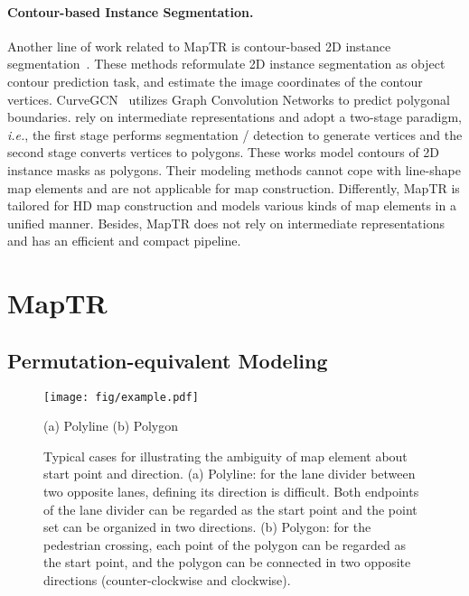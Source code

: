 \documentclass{article} \usepackage{iclr2023_conference,times}
\def\ie{\emph{i.e.}} \def\Ie{\emph{I.e.}}
\begin{document}
\paragraph{Contour-based Instance Segmentation.}
Another line of work related to MapTR is contour-based 2D instance segmentation~\citep{Zhu_2022_CVPR, polarmask, xu2019explicit,liu2021dance}. These methods  reformulate 2D instance segmentation as object contour prediction task, and estimate the image coordinates of the contour vertices. CurveGCN~\citep{ling2019fast} utilizes Graph Convolution Networks to predict polygonal boundaries. 
\cite{Lazarow_2022_CVPR,PolyTransform,building_seg,peng2020deep} rely on intermediate representations and adopt a two-stage paradigm, \ie, the first stage performs segmentation / detection to generate vertices and the second stage converts vertices to polygons.
These works model contours of 2D instance masks as polygons. Their modeling methods cannot cope with line-shape map elements and are not applicable for map construction. Differently, MapTR is tailored for HD map construction and models various kinds of map elements in a unified manner. Besides, MapTR does not rely on intermediate representations and has an efficient and compact pipeline.


\section{MapTR}
\subsection{Permutation-equivalent Modeling \label{sec:modeling}}


\begin{figure}[]
    \begin{center}
    \texttt{[image: fig/example.pdf]}
    \end{center}
    \vspace*{-0.7cm}
    \hspace*{1.5cm} { (a) Polyline} \hspace*{5.0cm} { (b) Polygon} 
    \vspace*{-0.2cm}
    \caption{Typical cases for illustrating the ambiguity of map element about start point and direction.
    (a) Polyline: for the lane divider between two opposite lanes, defining its direction is difficult. Both endpoints of the lane divider can be regarded as the start point and the point set can be organized in two directions.
    (b) Polygon: for the pedestrian crossing,
    each point of the polygon can be regarded as the start point, and the polygon can be connected in two opposite directions (counter-clockwise and clockwise).}
    \label{fig:ambiguity-case}
    \vspace*{-0.5cm}
\end{figure}
\end{document}
